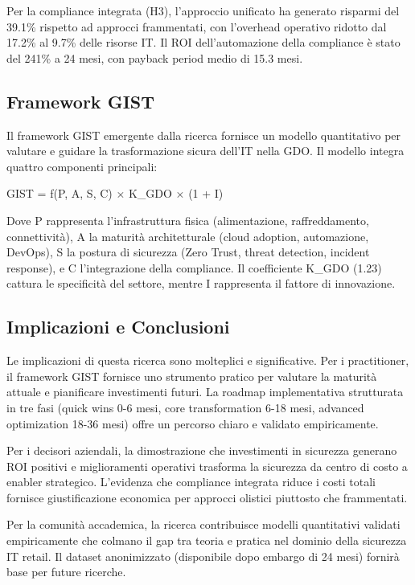 \documentclass[12pt,a4paper,oneside]{book}
\numberwithin{figure}{chapter} %
\numberwithin{table}{chapter}  %
\begin{document}
Per la compliance integrata (H3), l'approccio unificato ha generato
risparmi del 39.1\% rispetto ad approcci frammentati, con l'overhead
operativo ridotto dal 17.2\% al 9.7\% delle risorse IT. Il ROI
dell'automazione della compliance è stato del 241\% a 24 mesi, con
payback period medio di 15.3 mesi.

\subsection{Framework GIST}\label{framework-gist}

Il framework GIST emergente dalla ricerca fornisce un modello
quantitativo per valutare e guidare la trasformazione sicura dell'IT
nella GDO. Il modello integra quattro componenti principali:

GIST = f(P, A, S, C) × K\_GDO × (1 + I)

Dove P rappresenta l'infrastruttura fisica (alimentazione,
raffreddamento, connettività), A la maturità architetturale (cloud
adoption, automazione, DevOps), S la postura di sicurezza (Zero Trust,
threat detection, incident response), e C l'integrazione della
compliance. Il coefficiente K\_GDO (1.23) cattura le specificità del
settore, mentre I rappresenta il fattore di innovazione.

\subsection{Implicazioni e
Conclusioni}\label{implicazioni-e-conclusioni}

Le implicazioni di questa ricerca sono molteplici e significative. Per i
practitioner, il framework GIST fornisce uno strumento pratico per
valutare la maturità attuale e pianificare investimenti futuri. La
roadmap implementativa strutturata in tre fasi (quick wins 0-6 mesi,
core transformation 6-18 mesi, advanced optimization 18-36 mesi) offre
un percorso chiaro e validato empiricamente.

Per i decisori aziendali, la dimostrazione che investimenti in sicurezza
generano ROI positivi e miglioramenti operativi trasforma la sicurezza
da centro di costo a enabler strategico. L'evidenza che compliance
integrata riduce i costi totali fornisce giustificazione economica per
approcci olistici piuttosto che frammentati.

Per la comunità accademica, la ricerca contribuisce modelli quantitativi
validati empiricamente che colmano il gap tra teoria e pratica nel
dominio della sicurezza IT retail. Il dataset anonimizzato (disponibile
dopo embargo di 24 mesi) fornirà base per future ricerche.
\end{document}
